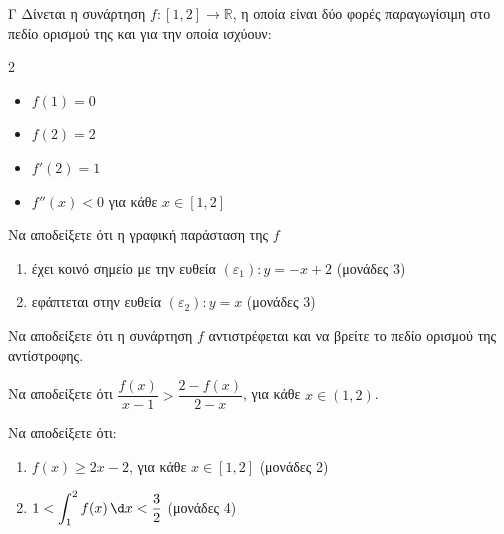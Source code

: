 \begin{thema}{Γ}
Δίνεται η συνάρτηση $f: [1, 2] \to \mathbb{R}$, η οποία είναι δύο φορές παραγωγίσιμη στο πεδίο ορισμού της και για την οποία ισχύουν:
\begin{multicols}{2}
\begin{itemize}
    \item $f(1) = 0$
    \item $f(2) = 2$
    \item $f'(2) = 1$
    \item $f''(x) < 0$ για κάθε $x \in [1, 2]$
\end{itemize}
\end{multicols}
\begin{erwthma}
    \item Να αποδείξετε ότι η γραφική παράσταση της $f$
    \begin{enumerate}[label=\roman*.]
        \item έχει κοινό σημείο με την ευθεία $(\varepsilon_1)\colon y = -x + 2$ \hfill (μονάδες 3)
        \item εφάπτεται στην ευθεία $(\varepsilon_2)\colon y = x$ \hfill (μονάδες 3)
    \end{enumerate}

    \item Να αποδείξετε ότι η συνάρτηση $f$ αντιστρέφεται και να βρείτε το πεδίο ορισμού της αντίστροφης. 

    \item Να αποδείξετε ότι $\dfrac{f(x)}{x-1} > \dfrac{2-f(x)}{2-x}$, για κάθε $x \in (1, 2)$. 

    \item Να αποδείξετε ότι:
    \begin{enumerate}[label=\roman*.]
        \item $f(x) \geq 2x - 2$, για κάθε $x \in [1, 2]$ \hfill (μονάδες 2)
        \item $1 < \displaystyle\int_1^2 f(x)\,\d x < \dfrac{3}{2}$ \hfill (μονάδες 4)
    \end{enumerate}
\end{erwthma}
\end{thema}


